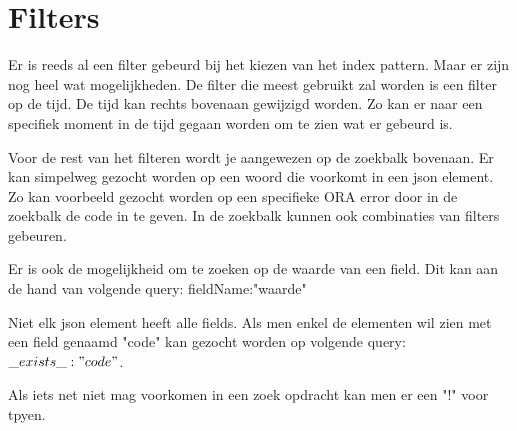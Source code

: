 \section{Filters}
\label{sec:filters}

Er is reeds al een filter gebeurd bij het kiezen van het index pattern. Maar er zijn nog heel wat mogelijkheden.
De filter die meest gebruikt zal worden is een filter op de tijd. De tijd kan rechts bovenaan gewijzigd worden. Zo kan er naar een specifiek moment in de tijd gegaan worden om te zien wat er gebeurd is.

Voor de rest van het filteren wordt je aangewezen op de zoekbalk bovenaan. Er kan simpelweg gezocht worden op een woord die voorkomt in een json element. Zo kan voorbeeld gezocht worden op een specifieke ORA error door in de zoekbalk de code in te geven.
In de zoekbalk kunnen ook combinaties van filters gebeuren.

Er is ook de mogelijkheid om te zoeken op de waarde van een field. Dit kan aan de hand van volgende query: fieldName:"waarde"

Niet elk json element heeft alle fields. Als men enkel de elementen wil zien met een field genaamd "code" kan gezocht worden op volgende query: $\_exists\_:"code"$.

Als iets net niet mag voorkomen in een zoek opdracht kan men er een "!" voor tpyen.




